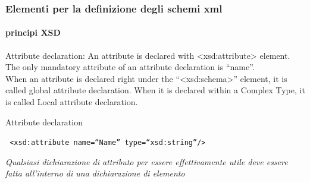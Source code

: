 





\begin{frame}
	\frametitle{Elementi per la definizione degli schemi xml}
	\framesubtitle{principi XSD}
	\addtocounter{nframe}{1}

	\begin{block}{Attribute declaration:}
		An attribute is declared with <xsd:attribute> element. The only mandatory attribute of an attribute declaration is ``name''.
		\\ When an attribute is declared right under the ``<xsd:schema>'' element, it is called global attribute declaration. When it is declared within a Complex Type, it is called Local attribute declaration.
	\end{block}


	\begin{block}{Attribute declaration}

		\texttt{
			<xsd:attribute name=``Name'' type=``xsd:string''/>
		}

	\end{block}
	\textit{Qualsiasi dichiarazione di attributo per essere effettivamente utile deve essere fatta all'interno di una dichiarazione di elemento}

\end{frame}


